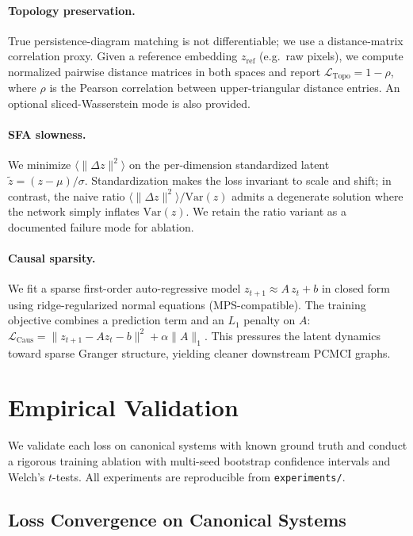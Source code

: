 \documentclass[11pt,a4paper]{article}
\begin{document}
\paragraph{Topology preservation.}
True persistence-diagram matching is not differentiable; we use a
distance-matrix correlation proxy. Given a reference embedding
$z_{\text{ref}}$ (e.g.\ raw pixels), we compute normalized pairwise
distance matrices in both spaces and report
$\mathcal{L}_{\text{Topo}} = 1 - \rho$, where $\rho$ is the
Pearson correlation between upper-triangular distance entries. An
optional sliced-Wasserstein mode is also provided.

\paragraph{SFA slowness.}
We minimize $\langle \|\Delta z\|^2 \rangle$ on the
per-dimension standardized latent $\tilde z = (z-\mu)/\sigma$. Standardization
makes the loss invariant to scale and shift; in contrast, the naive
ratio $\langle\|\Delta z\|^2\rangle / \mathrm{Var}(z)$ admits a
degenerate solution where the network simply inflates $\mathrm{Var}(z)$.
We retain the ratio variant as a documented failure mode for ablation.

\paragraph{Causal sparsity.}
We fit a sparse first-order auto-regressive model
$z_{t+1} \approx A\,z_t + b$ in closed form using ridge-regularized
normal equations (MPS-compatible). The training objective combines a
prediction term and an $L_1$ penalty on $A$:
$\mathcal{L}_{\text{Caus}} = \|z_{t+1}-Az_t-b\|^2 + \alpha \|A\|_1$.
This pressures the latent dynamics toward sparse Granger structure,
yielding cleaner downstream PCMCI graphs.

\section{Empirical Validation}
\label{sec:validation}

We validate each loss on canonical systems with known ground truth
and conduct a rigorous training ablation with multi-seed bootstrap
confidence intervals and Welch's $t$-tests. All experiments are
reproducible from \verb|experiments/|.

\subsection{Loss Convergence on Canonical Systems}
\end{document}
